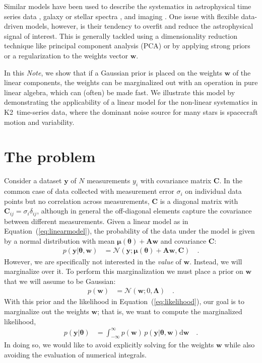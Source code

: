 \documentclass[modern]{rnaastex}
\newcommand{\project}[1]{\textsf{#1}}
\newcommand{\ktwo}{\project{K2}}
\newcommand{\documentname}{\textsl{Note}}
\renewcommand{\eqref}[1]{\ref{eq:#1}}
\newcommand{\Eq}[1]{Equation~(\eqref{#1})}
\newcommand{\eq}[1]{\Eq{#1}}
\newcommand{\eqlabel}[1]{\label{eq:#1}}
\newcommand{\dd}{\ensuremath{ \mathrm{d}}}
\newcommand{\bvec}[1]{{\ensuremath{\boldsymbol{#1}}}}
\newcommand{\Normal}{\ensuremath{\mathcal{N}}}
\newcommand{\mA}{\ensuremath{\bvec{A}}}
\newcommand{\mC}{\ensuremath{\bvec{C}}}
\newcommand{\mL}{\ensuremath{\bvec{\Lambda}}}
\newcommand{\vw}{\ensuremath{\bvec{w}}}
\newcommand{\vy}{\ensuremath{\bvec{y}}}
\newcommand{\vt}{\ensuremath{\bvec{\theta}}}
\newcommand{\vm}{\ensuremath{\bvec{\mu}(\bvec{\theta})}}
\begin{document}
Similar models have been used to describe the systematics in astrophysical time
series data \citep{Smith:2012, Wang:2016, Luger:2016}, galaxy or stellar spectra
\citep{Tsalmantza:2012, Ness:2015}, and imaging \citep{Fergus:2014,
Wang:2017}.
One issue with flexible data-driven models, however, is their tendency to
overfit and reduce the astrophysical signal of interest.
This is generally tackled using a dimensionality reduction technique like
principal component analysis (PCA) or by applying strong priors or a
regularization to the weights vector $\vw$.

In this \documentname, we show that if a
Gaussian prior is placed on the weights $\vw$ of the linear
components, the weights can be marginalized out with an operation in pure linear
algebra, which can (often) be made fast.
We illustrate this model by demonstrating the applicability of a linear model
for the non-linear systematics in \ktwo\ time-series data, where the dominant
noise source for many stars is spacecraft motion and variability.

\section{The problem}

Consider a dataset $\vy$ of $N$ measurements $y_i$ with covariance
matrix $\mC$.
In the common case of data collected with measurement error $\sigma_i$ on
individual data points but no correlation across measurements, $\mC$ is a
diagonal matrix with $\mC_{ij} = \sigma_{i}\delta_{ij}$, although in general
the off-diagonal elements capture the covariance between different
measurements. Given a linear model as in
\eq{linearmodel}, the probability of the data under the model is given by a
normal distribution with mean $\vm + \mA \vw$ and covariance $\mC$:
%
\begin{align}\eqlabel{likelihood}
p(\vy | \vt, \vw) &= \Normal(\vy; \vm + \mA \vw, \mC) \quad.
\end{align}
%
However, we are specifically not interested in the \emph{value} of $\vw$.
Instead, we will marginalize over it.
To perform this marginalization we must place a prior on $\vw$ that we will
assume to be Gaussian:
%
\begin{align}
p(\vw) &= \Normal(\vw; 0, \mL) \quad. \nonumber
\end{align}
%
With this prior and the likelihood in \eq{likelihood}, our goal is to marginalize
out the weights $\vw$; that is, we want to compute the marginalized
likelihood,
%
\begin{align}
\eqlabel{marglikeintegral}
p(\vy | \vt) &= \int_{-\infty}^{\infty} p(\vw)\,p(\vy | \vt, \vw) \dd\vw \quad.
\end{align}
%
In doing so, we would like to avoid explicitly solving for the weights $\vw$
while also avoiding the evaluation of numerical integrals.
\end{document}
